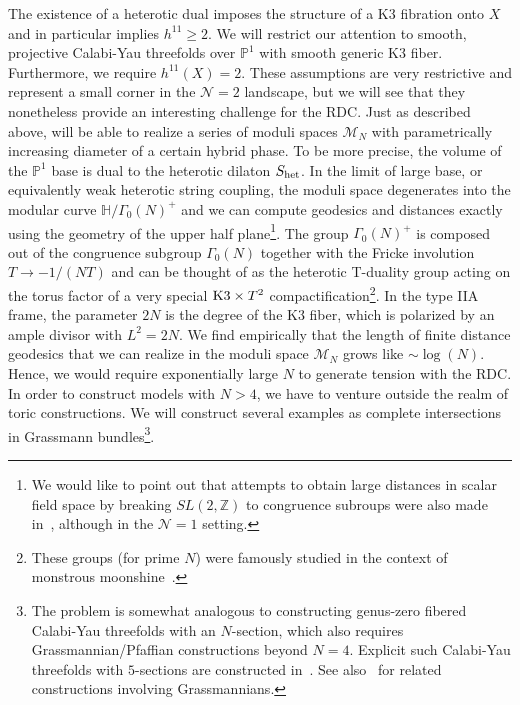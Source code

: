\documentclass[11pt,a4paper]{article}
\numberwithin{equation}{section}
\numberwithin{table}{section}\setlength{\multlinegap}{25pt}
\begin{document}
The existence of a heterotic dual imposes the structure of a K3 fibration onto $X$ and in particular implies $h^{11}\geq 2$. We will restrict our attention to smooth, projective Calabi-Yau threefolds over $\mathbb{P}^1$ with smooth generic K3 fiber. Furthermore, we require $h^{11}(X)=2$. These assumptions are very restrictive and represent a small corner in the $\mathcal{N}=2$ landscape, but we will see that they nonetheless provide an interesting challenge for the RDC. Just as described above, will be able to realize a series of moduli spaces $\mathcal{M}_N$ with parametrically increasing diameter of a certain hybrid phase. To be more precise, the volume of the $\mathbb{P}^1$ base is dual to the heterotic dilaton $S_\textup{het}$. In the limit of large base, or equivalently weak heterotic string coupling, the moduli space degenerates into the modular curve $\mathbb{H}/\Gamma_0(N)^+$ and we can compute geodesics and distances exactly using the geometry of the upper half plane\footnote{We would like to point out that attempts to obtain large distances in scalar field space by breaking $SL(2,\mathbb{Z})$ to congruence subroups were also made in~\cite{Hebecker:2017lxm}, although in the $\mathcal{N}=1$ setting.}. The group $\Gamma_0(N)^+$ is composed out of the congruence subgroup $\Gamma_0(N)$ together with the Fricke involution $T\to -1/(NT)$ and can be thought of as the heterotic T-duality group acting on the torus factor of a very special $\textup{K3}\times T^2$ compactification\footnote{These groups (for prime $N$) were famously studied in the context of monstrous moonshine~\cite{Conway:1979qga}.}. In the type IIA frame, the parameter $2N$ is the degree of the K3 fiber, which is polarized by an ample divisor with $L^2=2N$. We find empirically that the length of finite distance geodesics that we can realize in the moduli space $\mathcal{M}_N$ grows like $\sim\log(N)$. Hence, we would require exponentially large $N$ to generate tension with the RDC. In order to construct models with $N>4$, we have to venture outside the realm of toric constructions. We will construct several examples as complete intersections in Grassmann bundles\footnote{The problem is somewhat analogous to constructing genus-zero fibered Calabi-Yau threefolds with an $N$-section, which also requires Grassmannian/Pfaffian constructions beyond $N=4$. Explicit such Calabi-Yau threefolds with $5$-sections are constructed in~\cite{Knapp:2021vkm}. See also~\cite{Kimura:2016crs,Kimura:2019bzv} for related constructions involving Grassmannians.}.
\end{document}
